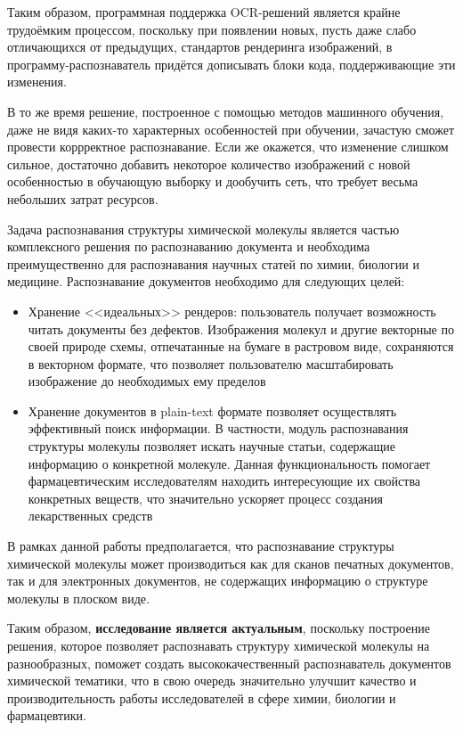 Таким образом, программная поддержка OCR-решений является крайне трудоёмким процессом, поскольку при появлении новых, пусть даже слабо отличающихся от предыдущих, стандартов рендеринга изображений, в программу-распознаватель придётся дописывать блоки кода, поддерживающие эти изменения.

В то же время решение, построенное с помощью методов машинного обучения, даже не видя каких-то характерных особенностей при обучении, зачастую сможет провести коррректное распознавание. Если же окажется, что изменение слишком сильное, достаточно добавить некоторое количество изображений с новой особенностью в обучающую выборку и дообучить сеть, что требует весьма небольших затрат ресурсов.

Задача распознавания структуры химической молекулы является частью комплексного решения по распознаванию документа и необходима преимущественно для распознавания научных статей по химии, биологии и медицине. Распознавание документов необходимо для следующих целей:
\begin{itemize}
	\item Хранение <<идеальных>> рендеров: пользователь получает возможность читать документы без дефектов. Изображения молекул и другие векторные по своей природе схемы, отпечатанные на бумаге в растровом виде, сохраняются в векторном формате, что позволяет пользователю масштабировать изображение до необходимых ему пределов
	
	\item Хранение документов в plain-text формате позволяет осуществлять эффективный поиск информации. В частности, модуль распознавания структуры молекулы позволяет искать научные статьи, содержащие информацию о конкретной молекуле. Данная функциональность помогает фармацевтическим исследователям находить интересующие их свойства конкретных веществ, что значительно ускоряет процесс создания лекарственных средств
\end{itemize}

В рамках данной работы предполагается, что распознавание структуры химической молекулы может производиться как для сканов печатных документов, так и для электронных документов, не содержащих информацию о структуре молекулы в плоском виде.

Таким образом, \textbf{исследование является актуальным}, поскольку построение решения, которое позволяет распознавать структуру химической молекулы на разнообразных, поможет создать высококачественный распознаватель документов химической тематики, что в свою очередь значительно улучшит качество и производительность работы исследователей в сфере химии, биологии и фармацевтики.

